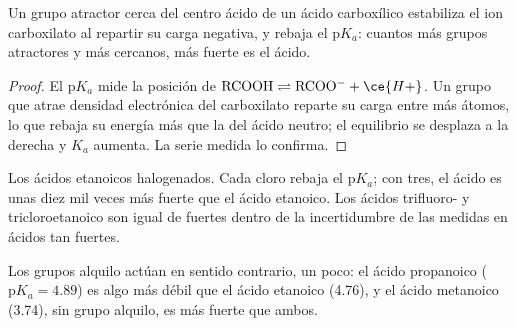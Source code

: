 \begin{proposition}\label{prop:b1:electronic-effects:inductive-pka}
Un grupo atractor cerca del centro ácido de un ácido carboxílico
estabiliza el ion carboxilato al repartir su carga negativa, y rebaja el
$\mathrm{p}K_a$: cuantos más grupos atractores y más cercanos, más fuerte
es el ácido.
\end{proposition}

\begin{proof}
El $\mathrm{p}K_a$ mide la posición de $\mathrm{RCOOH} \rightleftharpoons
\mathrm{RCOO^-} + \ce{H+}$. Un grupo que atrae densidad electrónica del
carboxilato reparte su carga entre más átomos, lo que rebaja su energía
más que la del ácido neutro; el equilibrio se desplaza a la derecha y
$K_a$ aumenta. La serie medida lo confirma.
\end{proof}

\begin{omfigure}

{\small Los ácidos etanoicos halogenados. Cada cloro rebaja el
$\mathrm{p}K_a$; con tres, el ácido es unas diez mil veces más fuerte que
el ácido etanoico. Los ácidos trifluoro- y tricloroetanoico son igual de
fuertes dentro de la incertidumbre de las medidas en ácidos tan
fuertes.}
\end{omfigure}

Los grupos alquilo actúan en sentido contrario, un poco: el ácido
propanoico ($\mathrm{p}K_a
= 4.89$) es algo más débil que el ácido etanoico (4.76), y el ácido
metanoico (3.74), sin grupo alquilo, es más fuerte que ambos.

